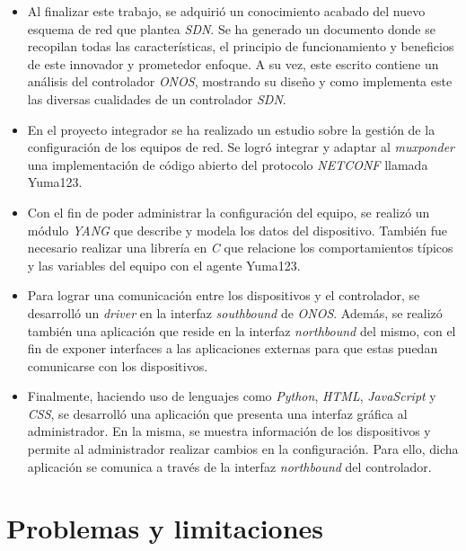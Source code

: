 \begin{itemize}

    \item Al finalizar este trabajo, se adquirió un conocimiento acabado del nuevo esquema de red que plantea  \textit{SDN}. Se ha generado un documento donde se recopilan todas las características, el principio de funcionamiento y beneficios de este innovador y prometedor enfoque. A su vez, este escrito contiene un análisis del controlador \textit{ONOS}, mostrando su diseño y como implementa este las diversas cualidades de un controlador  \textit{SDN}.

    \item En el proyecto integrador se ha realizado un estudio sobre la gestión de la configuración de los equipos de red. Se logró integrar y adaptar al \textit{muxponder} una implementación de código abierto del protocolo \textit{NETCONF} llamada Yuma123. 
    
    \item Con el fin de poder administrar la configuración del equipo, se realizó un módulo \textit{YANG} que describe y modela los datos del dispositivo. También fue necesario realizar una librería en \textit{C} que relacione los comportamientos típicos y las variables del equipo con el agente Yuma123.
        
    \item Para lograr una comunicación entre los dispositivos y el controlador, se desarrolló un \textit{driver} en la interfaz \textit{southbound} de \textit{ONOS}. Además, se realizó también una aplicación que reside en la interfaz \textit{northbound} del mismo, con el fin de exponer interfaces a las aplicaciones externas para que estas puedan comunicarse con los dispositivos. 

    \item Finalmente, haciendo uso de lenguajes como \textit{Python}, \textit{HTML}, \textit{JavaScript} y \textit{CSS}, se desarrolló una aplicación que presenta una interfaz gráfica al administrador. En la misma, se muestra información de los dispositivos y permite al administrador realizar cambios en la configuración. Para ello, dicha aplicación se comunica a través de la interfaz \textit{northbound} del controlador. 

\end{itemize}


\section{Problemas y limitaciones} \label{problemasylimi}

